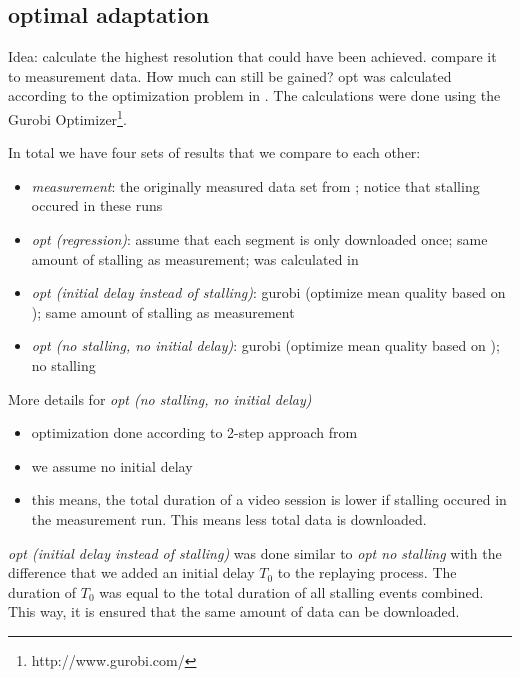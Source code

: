 \subsection{optimal adaptation}

Idea: calculate the highest resolution that could have been achieved. compare it to measurement data. How much can still be gained?
opt was calculated according to the optimization problem in \cite{hossfeld2015identifying}. The calculations were done using the Gurobi Optimizer\footnote{http://www.gurobi.com/}.

In total we have four sets of results that we compare to each other:
\begin{itemize}
\item \textit{measurement}: the originally measured data set from \cite{sieber16sacrificing}; notice that stalling occured in these runs
\item \textit{opt (regression)}: assume that each segment is only downloaded once; same amount of stalling as measurement; was calculated in \cite{sieber16sacrificing}
\item \textit{opt (initial delay instead of stalling)}: gurobi (optimize mean quality based on \cite{hossfeld2015identifying}); same amount of stalling as measurement
\item \textit{opt (no stalling, no initial delay)}: gurobi (optimize mean quality based on \cite{hossfeld2015identifying}); no stalling
\end{itemize}


More details for \textit{opt (no stalling, no initial delay)}
\begin{itemize}
\item optimization done according to 2-step approach from \cite{miller2013optimal}
\item we assume no initial delay
\item this means, the total duration of a video session is lower if stalling occured in the measurement run. This means less total data is downloaded.
\end{itemize}
\textit{opt (initial delay instead of stalling)} was done similar to \textit{opt no stalling} with the difference that we added an initial delay $T_0$ to the replaying process. The duration of $T_0$ was equal to the total duration of all stalling events combined. This way, it is ensured that the same amount of data can be downloaded.

